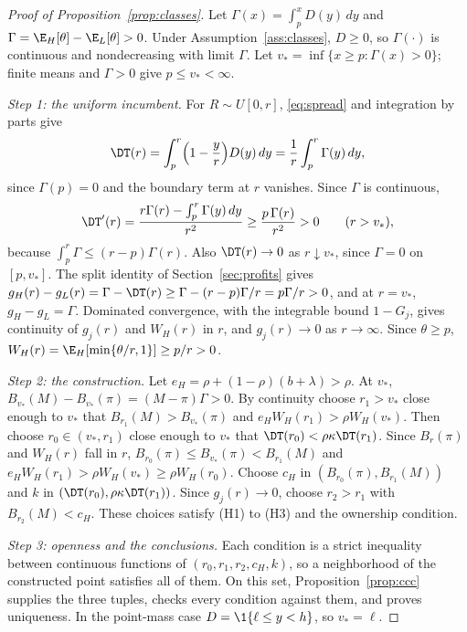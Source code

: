 \begin{proof}[Proof of Proposition~\ref{prop:classes}]
Let \(\Gamma(x)=\int_p^xD(y)\,dy\) and \(\Gamma=\E_H[\theta]-\E_L[\theta]>0\). Under
Assumption~\ref{ass:classes}, \(D\ge0\), so \(\Gamma(\cdot)\) is continuous and nondecreasing with limit \(\Gamma\).
Let \(v_*=\inf\{x\ge p:\Gamma(x)>0\}\); finite means and \(\Gamma>0\) give \(p\le v_*<\infty\).

\emph{Step 1: the uniform incumbent.} For \(R\sim U[0,r]\), \eqref{eq:spread} and integration by parts give
\[
\DT(r)=\int_p^r\Bigl(1-\frac yr\Bigr)D(y)\,dy=\frac1r\int_p^r\Gamma(y)\,dy ,
\]
since \(\Gamma(p)=0\) and the boundary term at \(r\) vanishes. Since \(\Gamma\) is continuous,
\[
\DT'(r)=\frac{r\Gamma(r)-\int_p^r\Gamma(y)\,dy}{r^2}\ge\frac{p\,\Gamma(r)}{r^2}>0\qquad(r>v_*),
\]
because \(\int_p^r\Gamma\le(r-p)\Gamma(r)\). Also \(\DT(r)\to0\) as \(r\downarrow v_*\), since \(\Gamma=0\) on
\([p,v_*]\). The split identity of Section~\ref{sec:profits} gives
\(g_H(r)-g_L(r)=\Gamma-\DT(r)\ge\Gamma-(r-p)\Gamma/r=p\Gamma/r>0\), and at \(r=v_*\), \(g_H-g_L=\Gamma\). Dominated
convergence, with the integrable bound \(1-G_j\), gives continuity of \(g_j(r)\) and \(W_H(r)\) in \(r\), and
\(g_j(r)\to0\) as \(r\to\infty\). Since \(\theta\ge p\), \(W_H(r)=\E_H[\min\{\theta/r,1\}]\ge p/r>0\).

\emph{Step 2: the construction.} Let \(e_H=\rho+(1-\rho)(b+\lambda)>\rho\). At \(v_*\),
\(B_{v_*}(M)-B_{v_*}(\pi)=(M-\pi)\Gamma>0\). By continuity choose \(r_1>v_*\) close enough to \(v_*\) that
\(B_{r_1}(M)>B_{v_*}(\pi)\) and \(e_HW_H(r_1)>\rho W_H(v_*)\). Then choose \(r_0\in(v_*,r_1)\) close enough to
\(v_*\) that \(\DT(r_0)<\rho\kappa\DT(r_1)\). Since \(B_r(\pi)\) and \(W_H(r)\) fall in \(r\),
\(B_{r_0}(\pi)\le B_{v_*}(\pi)<B_{r_1}(M)\) and \(e_HW_H(r_1)>\rho W_H(v_*)\ge\rho W_H(r_0)\). Choose \(c_H\) in
\((B_{r_0}(\pi),B_{r_1}(M))\) and \(k\) in \((\DT(r_0),\rho\kappa\DT(r_1))\). Since \(g_j(r)\to0\), choose
\(r_2>r_1\) with \(B_{r_2}(M)<c_H\). These choices satisfy (H1) to (H3) and the ownership condition.

\emph{Step 3: openness and the conclusions.} Each condition is a strict inequality between continuous functions of
\((r_0,r_1,r_2,c_H,k)\), so a neighborhood of the constructed point satisfies all of them. On this set,
Proposition~\ref{prop:ccc} supplies the three tuples, checks every condition against them, and proves uniqueness. In
the point-mass case \(D=\1\{\ell\le y<h\}\), so \(v_*=\ell\).
\end{proof}

